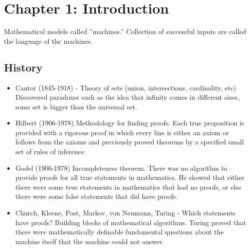 \section{Chapter 1: Introduction}
Mathematical models called ''machines.''
Collection of successful inputs are called the language of the machines.

\subsection{History}
\begin{itemize}
    \item Cantor (1845-1918) - Theory of sets (union, intersections, cardinality, etc) Discovered paradoxes such as the idea that infinity comes in different sizes, some set is bigger than the universal set.
    \item Hilbert (1906-1978) Methodology for finding proofs.
    Each true proposition is provided with a rigorous proof in which every line is either an axiom or follows from the axioms and previously proved theorems by a specified small set of rules of inference.
    \item Godel (1906-1978) Incompleteness theorem.
    There was no algorithm to provide proofs for all true statements in mathematics.
    He showed that either there were some true statements in mathematics that had no proofs, or else there were some false statements that did have proofs.
    \item Church, Kleene, Post, Markov, von Neumann, Turing - Which statements have proofs?
    Building blocks of mathematical algorithms.
    Turing proved that there were mathematically definable fundamental questions about the machine itself that the machine could not answer.
\end{itemize}

